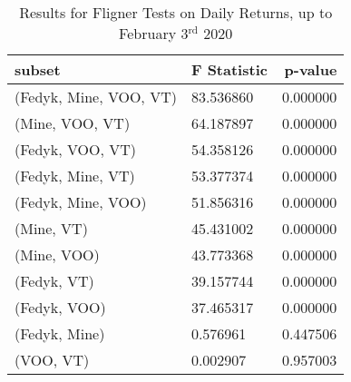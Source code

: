 \begin{appendices}
\begin{table}[ht]
\centering
\caption{Results for Fligner Tests on Daily Returns, up to February 3$^\text{rd}$ 2020}
    \begin{tabular}{l|ll}
    \toprule
    \textbf{subset}        & \multicolumn{1}{r}{\textbf{F Statistic}} & \multicolumn{1}{r}{\textbf{p-value}} \\ \midrule
    (Fedyk, Mine, VOO, VT)              & 83.536860                      & 0.000000                       \\
    (Mine, VOO, VT)                     & 64.187897                      & 0.000000                       \\
    (Fedyk, VOO, VT)                    & 54.358126                      & 0.000000                       \\
    (Fedyk, Mine, VT)                   & 53.377374                      & 0.000000                       \\
    (Fedyk, Mine, VOO)                  & 51.856316                      & 0.000000                       \\
    (Mine, VT)                          & 45.431002                      & 0.000000                       \\
    (Mine, VOO)                         & 43.773368                      & 0.000000                       \\
    (Fedyk, VT)                         & 39.157744                      & 0.000000                       \\
    (Fedyk, VOO)                        & 37.465317                      & 0.000000                       \\
    (Fedyk, Mine)                       & 0.576961                       & 0.447506                       \\
    (VOO, VT)                           & 0.002907                       & 0.957003                      
    \end{tabular}
\label{tab:fligner_before}
\end{table}

    

\end{appendices}
